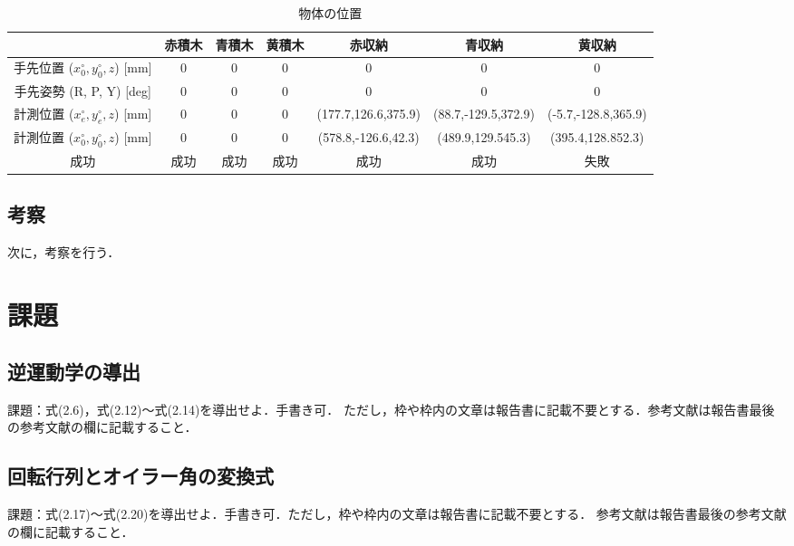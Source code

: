 \begin{table}[h]
  \centering
  \caption{物体の位置}
  \begin{tabular}{|c|c|c|c|c|c|c|}
    \hline
                                                      & 赤積木 & 青積木 & 黄積木 & 赤収納              & 青収納              & 黄収納              \\ \hline
    \hline
    手先位置 ($x_{0}^{\circ}, y_{0}^{\circ}, z$) [mm] & 0      & 0      & 0      & 0                   & 0                   & 0                   \\ \hline
    手先姿勢 (R, P, Y) [deg]                          & 0      & 0      & 0      & 0                   & 0                   & 0                   \\ \hline
    計測位置 ($x_{e}^{\circ}, y_{e}^{\circ}, z$) [mm] & 0      & 0      & 0      & (177.7,126.6,375.9) & (88.7,-129.5,372.9) & (-5.7,-128.8,365.9) \\ \hline
    計測位置 ($x_{0}^{\circ}, y_{0}^{\circ}, z$) [mm] & 0      & 0      & 0      & (578.8,-126.6,42.3) & (489.9,129.545.3)   & (395.4,128.852.3)   \\ \hline
    成功                                              & 成功   & 成功   & 成功   & 成功                & 成功                & 失敗                \\ \hline 
    
  \end{tabular}
\end{table}

\subsection{考察}
次に，考察を行う．


\section{課題}

\subsection{逆運動学の導出}
課題：式(2.6)，式(2.12)～式(2.14)を導出せよ．手書き可．
ただし，枠や枠内の文章は報告書に記載不要とする．参考文献は報告書最後の参考文献の欄に記載すること．

\subsection{回転行列とオイラー角の変換式}
課題：式(2.17)～式(2.20)を導出せよ．手書き可．ただし，枠や枠内の文章は報告書に記載不要とする．
参考文献は報告書最後の参考文献の欄に記載すること．

